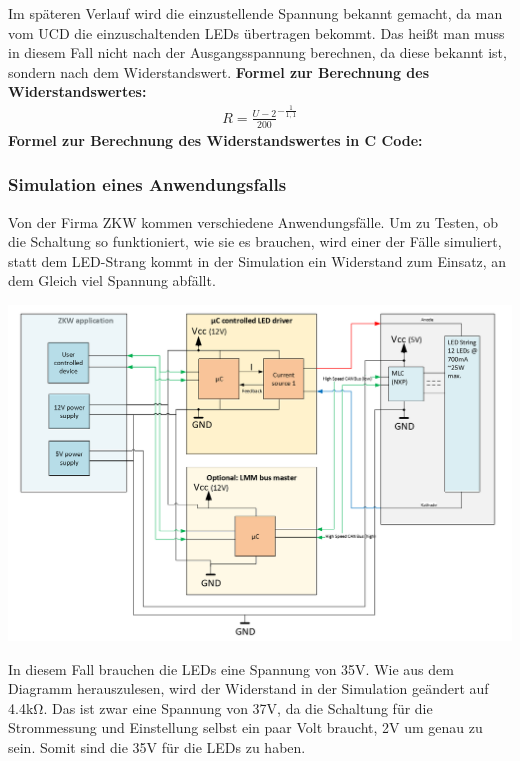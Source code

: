 \documentclass[paper=a4, 12pt]{scrreprt}
\begin{document}
			Im späteren Verlauf wird die einzustellende Spannung bekannt gemacht, da man vom UCD die einzuschaltenden LEDs übertragen bekommt. Das heißt man muss in diesem Fall nicht nach der Ausgangsspannung berechnen, da diese bekannt ist, sondern nach dem Widerstandswert. \hfill \break \hfill \break
			\textbf{Formel zur Berechnung des Widerstandswertes:}
			\begin{align*} 
			R=\frac{ U - 2 }{ 200 }^{ -\frac{ 1 }{ 1,1 } }
			\end{align*}
			\textbf{Formel zur Berechnung des Widerstandswertes in C Code:}
			
			 
			\subsubsection{Simulation eines Anwendungsfalls}\hfill \break
			Von der Firma ZKW kommen verschiedene Anwendungsfälle. Um zu Testen, ob die Schaltung so funktioniert, wie sie es brauchen, wird einer der Fälle simuliert, statt dem LED-Strang kommt in der Simulation ein Widerstand zum Einsatz, an dem Gleich viel Spannung abfällt.
			\begin{adjustbox}{center,caption={Anwendungsfall von ZKW},label={fig:anwendungsfall},nofloat=figure,vspace=\bigskipamount}
				\includegraphics[width=\textwidth]{img/SimulierterAnwendungsfall.PNG}
			\end{adjustbox}
			In diesem Fall brauchen die LEDs eine Spannung von 35V. Wie aus dem Diagramm herauszulesen, wird der Widerstand in der Simulation geändert auf 4.4kΩ. Das ist zwar eine Spannung von 37V, da die Schaltung für die Strommessung und Einstellung selbst ein paar Volt braucht, 2V um genau zu sein. Somit sind die 35V für die LEDs zu haben. 
			\newpage
			
\end{document}
